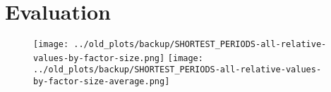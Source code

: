 
\chapter{Evaluation}
\label{ch:Evaluation}
\begin{figure}[h]
	\texttt{[image: ../old\_plots/backup/SHORTEST\_PERIODS-all-relative-values-by-factor-size.png]}
	\texttt{[image: ../old\_plots/backup/SHORTEST\_PERIODS-all-relative-values-by-factor-size-average.png]}
\end{figure}

